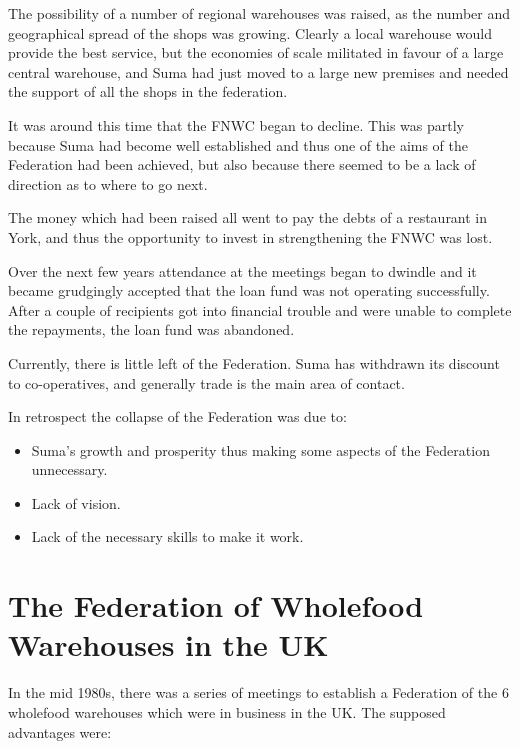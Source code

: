 The possibility of a number of regional warehouses was raised, as the number and geographical spread of the shops was growing. Clearly a local warehouse would provide the best service, but the economies of scale militated in favour of a large central warehouse, and Suma had just moved to a large new premises and needed the support of all the shops in the federation.

It was around this time that the FNWC began to decline. This was partly because Suma had become well established and thus one of the aims of the Federation had been achieved, but also because there seemed to be a lack of direction as to where to go next.

The money which had been raised all went to pay the debts of a restaurant in York, and thus the opportunity to invest in strengthening the FNWC was lost.

Over the next few years attendance at the meetings began to dwindle and it became grudgingly accepted that the loan fund was not operating successfully. After a couple of recipients got into financial trouble and were unable to complete the repayments, the loan fund was abandoned.

Currently, there is little left of the Federation. Suma has withdrawn its discount to co-operatives, and generally trade is the main area of contact.

In retrospect the collapse of the Federation was due to:

\begin{itemize}
  \item Suma's growth and prosperity thus making some aspects of the Federation unnecessary.

  \item Lack of vision.

  \item Lack of the necessary skills to make it work.

\end{itemize}

\section*{The Federation of Wholefood Warehouses in the UK}
In the mid 1980s, there was a series of meetings to establish a Federation of the 6 wholefood warehouses which were in business in the UK. The supposed advantages were:

